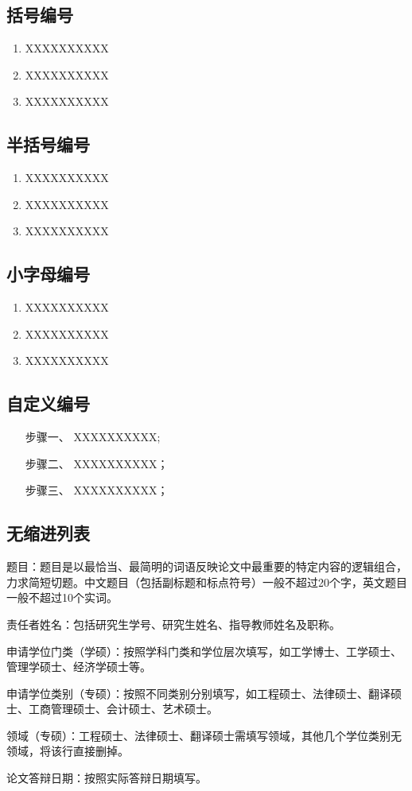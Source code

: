 \subsection{括号编号}
\begin{enumerate}[label=(\arabic*)]
 \item XXXXXXXXXX
 \item XXXXXXXXXX
 \item XXXXXXXXXX
\end{enumerate}

\subsection{半括号编号}
\begin{enumerate}[label=\arabic*)]
 \item XXXXXXXXXX
 \item XXXXXXXXXX
 \item XXXXXXXXXX
\end{enumerate}

\subsection{小字母编号}
\begin{enumerate}[label=\alph*)]
 \item XXXXXXXXXX
 \item XXXXXXXXXX
 \item XXXXXXXXXX
\end{enumerate}

\subsection{自定义编号}
\begin{enumerate}[leftmargin = 6em, labelsep = 0em]
    \item[步骤一、] XXXXXXXXXX;
    \item[步骤二、] XXXXXXXXXX；
    \item[步骤三、] XXXXXXXXXX；
\end{enumerate}

\subsection{无缩进列表}
\begin{enumerateni}
    \item 题目：题目是以最恰当、最简明的词语反映论文中最重要的特定内容的逻辑组合，力求简短切题。中文题目（包括副标题和标点符号）一般不超过20个字，英文题目一般不超过10个实词。
    \item 责任者姓名：包括研究生学号、研究生姓名、指导教师姓名及职称。
    \item 申请学位门类（学硕）：按照学科门类和学位层次填写，如工学博士、工学硕士、管理学硕士、经济学硕士等。
    \item 申请学位类别（专硕）：按照不同类别分别填写，如工程硕士、法律硕士、翻译硕士、工商管理硕士、会计硕士、艺术硕士。
    \item 领域（专硕）：工程硕士、法律硕士、翻译硕士需填写领域，其他几个学位类别无领域，将该行直接删掉。
    \item 论文答辩日期：按照实际答辩日期填写。
\end{enumerateni}

